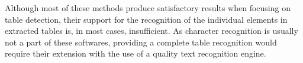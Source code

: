Although most of these methods produce satisfactory results when focusing on table detection, their support for the recognition of the individual elements in extracted tables is, in most cases, insufficient. As character recognition is usually not a part of these softwares, providing a complete table recognition would require their extension with the use of a quality text recognition engine. 

